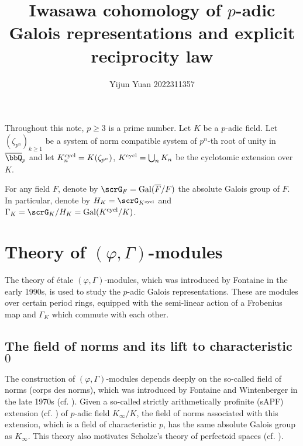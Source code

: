 \documentclass[a4paper,oneside]{amsart}
\title{Iwasawa cohomology of $p$-adic Galois representations and explicit reciprocity law}
\author{Yijun Yuan\textsuperscript{\orcidlink{0000-0001-6571-6980}} 2022311357}
\numberwithin{equation}{section}
\numberwithin{figure}{section}
\begin{document}
\maketitle
Throughout this note, $p\geq 3$ is a prime number. Let $K$ be a $p$-adic field. Let $(\zeta_{p^n})_{k\geq 1}$ be a system of norm compatible system of $p^n$-th root of unity in $\overline{\bbQ}_p$ and let $K_n^{\operatorname{cycl}}=K(\zeta_{p^n})$, $K^{\operatorname{cycl}}=\bigcup_n K_n$ be the cyclotomic extension over $K$.

For any field $F$, denote by $\scrG_F=\opn{Gal}(\overline{F}/F)$ the absolute Galois group of $F$. In particular, denote by $H_K=\scrG_{K^{\opn{cycl}}}$ and $\Gamma_K=\scrG_K/H_K=\opn{Gal}(K^{\opn{cycl}}/K)$.
\section{Theory of $(\varphi,\Gamma)$-modules}
The theory of \'etale $(\varphi,\Gamma)$-modules, which was introduced by Fontaine in the early 1990s, is used to study the $p$-adic Galois representations. These are modules over certain period rings, equipped with the semi-linear action of a Frobenius map and $\Gamma_K$ which commute with each other.

\subsection{The field of norms and its lift to characteristic $0$}
The construction of $(\varphi,\Gamma)$-modules depends deeply on the so-called field of norms (corps des norms), which was introduced by Fontaine and Wintenberger in the late 1970s (cf. \cite{fontaine_extensions_1979,fontaine_corps_1979,wintenberger_corps_1983}). Given a so-called strictly arithmetically profinite (sAPF) extension (cf. \cite[D\'efinitions 1.2.1]{wintenberger_corps_1983}) of $p$-adic field $K_\infty/K$, the field of norms associated with this extension, which is a field of characteristic $p$, has the same absolute Galois group as $K_\infty$. This theory also motivates Scholze's theory of perfectoid spaces (cf. \cite[Theorem 1.1]{scholze_perfectoid_2012}).
\end{document}
